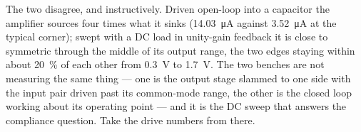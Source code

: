 The two disagree, and instructively. Driven open-loop into a capacitor the amplifier
sources four times what it sinks (\SI{14.03}{\micro\ampere} against
\SI{3.52}{\micro\ampere} at the typical corner); swept with a DC load in unity-gain
feedback it is close to symmetric through the middle of its output range, the two edges
staying within about \SI{20}{\percent} of each other from \SI{0.3}{\volt} to
\SI{1.7}{\volt}. The two benches are not measuring the same thing --- one is the output
stage slammed to one side with the input pair driven past its common-mode range, the
other is the closed loop working about its operating point --- and it is the DC sweep
that answers the compliance question. Take the drive numbers from there.
